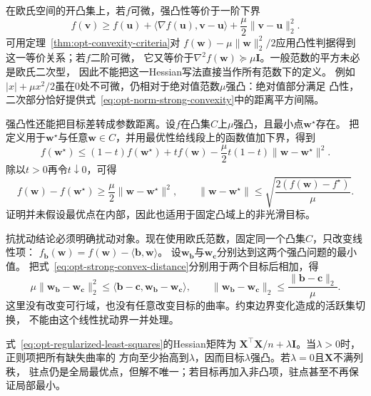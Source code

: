 在欧氏空间的开凸集上，若$f$可微，强凸性等价于一阶下界
\begin{equation}
  f(\bm{v})\geq f(\bm{u})+
  \langle\nabla f(\bm{u}),\bm{v}-\bm{u}\rangle
  +\frac{\mu}{2}\lVert\bm{v}-\bm{u}\rVert_2^2.
  \label{eq:opt-first-order-strong-convexity}
\end{equation}
可用定理~\ref{thm:opt-convexity-criteria}对
$f(\bm{w})-\mu\lVert\bm{w}\rVert_2^2/2$应用凸性判据得到这一等价关系；若$f$二阶可微，
它又等价于$\nabla^2f(\bm{w})\succeq\mu\bm{I}$。一般范数的平方未必是欧氏二次型，
因此不能把这一Hessian写法直接当作所有范数下的定义。
例如$|x|+\mu x^2/2$虽在$0$处不可微，仍相对于绝对值范数$\mu$强凸：绝对值部分满足
凸性，二次部分恰好提供式~\eqref{eq:opt-norm-strong-convexity}中的距离平方间隔。

强凸性还能把目标差转成参数距离。设$f$在凸集$C$上$\mu$强凸，且最小点$\bm w^\star$存在。
把定义用于$\bm w^\star$与任意$\bm w\in C$，并用最优性给线段上的函数值加下界，得到
\[
 f(\bm w^\star)\leq(1-t)f(\bm w^\star)+tf(\bm w)
 -\frac{\mu}{2}t(1-t)\|\bm w-\bm w^\star\|^2.
\]
除以$t>0$再令$t\downarrow0$，可得
\begin{equation}
 f(\bm w)-f(\bm w^\star)\geq\frac{\mu}{2}\|\bm w-\bm w^\star\|^2,
 \qquad
 \|\bm w-\bm w^\star\|\leq\sqrt{\frac{2(f(\bm w)-f^\star)}{\mu}}.
 \label{eq:opt-strong-convex-distance}
\end{equation}
证明并未假设最优点在内部，因此也适用于固定凸域上的非光滑目标。

抗扰动结论必须明确扰动对象。现在使用欧氏范数，固定同一个凸集$C$，只改变线性项：
$f_{\bm b}(\bm w)=f(\bm w)-\langle\bm b,\bm w\rangle$。
设$\bm w_{\bm b}$与$\bm w_{\bm c}$分别达到这两个强凸问题的最小值。
把式~\eqref{eq:opt-strong-convex-distance}分别用于两个目标后相加，得
\[
 \mu\|\bm w_{\bm b}-\bm w_{\bm c}\|_2^2
 \leq\langle\bm b-\bm c,\bm w_{\bm b}-\bm w_{\bm c}\rangle,
 \qquad
 \|\bm w_{\bm b}-\bm w_{\bm c}\|_2\leq\frac{\|\bm b-\bm c\|_2}{\mu}.
\]
这里没有改变可行域，也没有任意改变目标的曲率。约束边界变化造成的活跃集切换，
不能由这个线性扰动界一并处理。

式~\eqref{eq:opt-regularized-least-squares}的Hessian矩阵为
$\bm{X}^{\top}\bm{X}/n+\lambda\bm{I}$。当$\lambda>0$时，正则项把所有缺失曲率的
方向至少抬高到$\lambda$，因而目标$\lambda$强凸。若$\lambda=0$且$\bm{X}$不满列秩，
驻点仍是全局最优点，但解不唯一；若目标再加入非凸项，驻点甚至不再保证局部最小。

